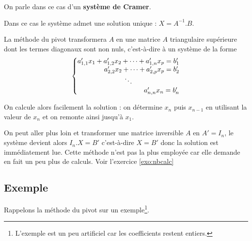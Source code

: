 On parle dans ce cas d'un {\bf système de Cramer}.

Dans ce cas le système admet une solution unique : $X = A^{-1}.B$.

La méthode du pivot transformera $A$ en une matrice $A$ triangulaire supérieure dont les termes diagonaux sont non nuls, c'est-à-dire à un système de la forme
\[\left\{
\begin{matrix}a'_{1,1}x_1+a'_{1,2}x_2+\cdots+a'_{1,n}x_p=b'_1\\
\hfill a'_{2,2}x_2+\cdots+a'_{2,p}x_p=b'_2\\
\ddots\\
\hfill a'_{n,n}x_n=b'_n\\
\end{matrix}\right. 
\]

On calcule alors facilement la solution :  on détermine $x_n$ puis $x_{n-1}$ en utilisant la valeur de $x_n$ et on remonte ainsi jusqu'à $x_1$. 
\medskip

On peut aller plus loin et transformer une matrice inversible $A$ en $A'=I_n$, le système devient alors $I_n.X=B'$ c'est-à-dire $X=B'$ donc la solution est immédiatement lue.
Cette méthode n'est pas la plus employée car elle demande en fait un peu plus de calculs.
Voir l'exercice \ref{exo:nbcalc}

\newpage
\subsection{Exemple}
Rappelons la méthode du pivot sur un exemple\footnote{L'exemple est un peu artificiel car les coefficients restent entiers.}.

